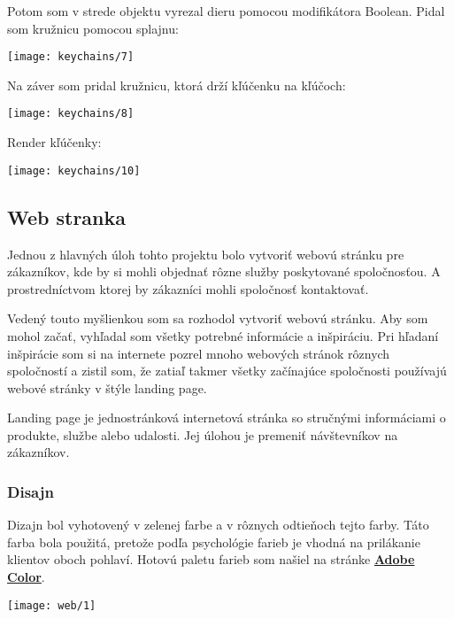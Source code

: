         Potom som v strede objektu vyrezal dieru pomocou modifikátora Boolean. Pidal som kružnicu pomocou splajnu: \\
        \begin{center}
          \texttt{[image: keychains/7]}
        \end{center}

        Na záver som pridal kružnicu, ktorá drží kľúčenku na kľúčoch: \\
        \begin{center}
          \texttt{[image: keychains/8]}
        \end{center}

        Render kľúčenky: \\
        \begin{center}
          \texttt{[image: keychains/10]}
        \end{center}

      \subsection{Web stranka}
      Jednou z hlavných úloh tohto projektu bolo vytvoriť webovú stránku pre zákazníkov, kde by si mohli objednať rôzne služby poskytované spoločnosťou. A prostredníctvom ktorej by zákazníci mohli spoločnosť kontaktovať.

      Vedený touto myšlienkou som sa rozhodol vytvoriť webovú stránku. Aby som mohol začať, vyhľadal som všetky potrebné informácie a inšpiráciu. Pri hľadaní inšpirácie som si na internete pozrel mnoho webových stránok rôznych spoločností a zistil som, že zatiaľ takmer všetky začínajúce spoločnosti používajú webové stránky v štýle landing page.

      Landing page je jednostránková internetová stránka so stručnými informáciami o produkte, službe alebo udalosti. Jej úlohou je premeniť návštevníkov na zákazníkov.
 
      \subsubsection{Disajn}
      Dizajn bol vyhotovený v zelenej farbe a v rôznych odtieňoch tejto farby. Táto farba bola použitá, pretože podľa psychológie farieb je vhodná na prilákanie klientov oboch pohlaví. Hotovú paletu farieb som našiel na stránke \textbf{\href{https://color.adobe.com/ru/}{Adobe Color}}.

      \begin{center}
        \texttt{[image: web/1]}
      \end{center}

